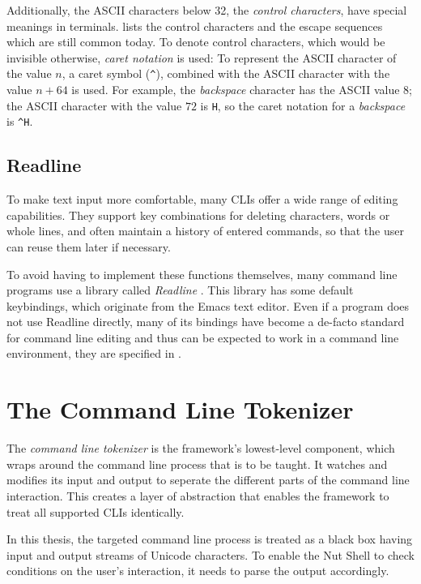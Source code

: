 \documentclass[paper=a4,twoside,abstract=on,cleardoublepage=empty,numbers=noenddot,toc=bib,12pt,appendixprefix=true]{scrreprt}
\begin{document}
Additionally, the ASCII characters below 32, the \emph{control characters}, have special meanings in terminals.  lists the control characters and the escape sequences which are still common today. To denote control characters, which would be invisible otherwise, \emph{caret notation} is used: To represent the ASCII character of the value $n$, a caret symbol (\texttt{\^}), combined with the ASCII character with the value $n+64$ is used. For example, the \emph{backspace} character has the ASCII value $8$; the ASCII character with the value $72$ is \texttt{H}, so the caret notation for a \emph{backspace} is \texttt{\^{}H}.

\section{Readline}

To make text input more comfortable, many CLIs offer a wide range of editing capabilities. They support key combinations for deleting characters, words or whole lines, and often maintain a history of entered commands, so that the user can reuse them later if necessary.

To avoid having to implement these functions themselves, many command line programs use a library called \emph{Readline} \cite{readline}. This library has some default keybindings, which originate from the Emacs text editor. Even if a program does not use Readline directly, many of its bindings have become a de-facto standard for command line editing and thus can be expected to work in a command line environment, they are specified in .

\chapter{The Command Line Tokenizer}
\label{sec:cliparser}

The \emph{command line tokenizer} is the framework's lowest-level component, which wraps around the command line process that is to be taught. It watches and modifies its input and output to seperate the different parts of the command line interaction. This creates a layer of abstraction that enables the framework to treat all supported CLIs identically.

In this thesis, the targeted command line process is treated as a black box having input and output streams of Unicode characters. To enable the Nut Shell to check conditions on the user's interaction, it needs to parse the output accordingly.
\end{document}

